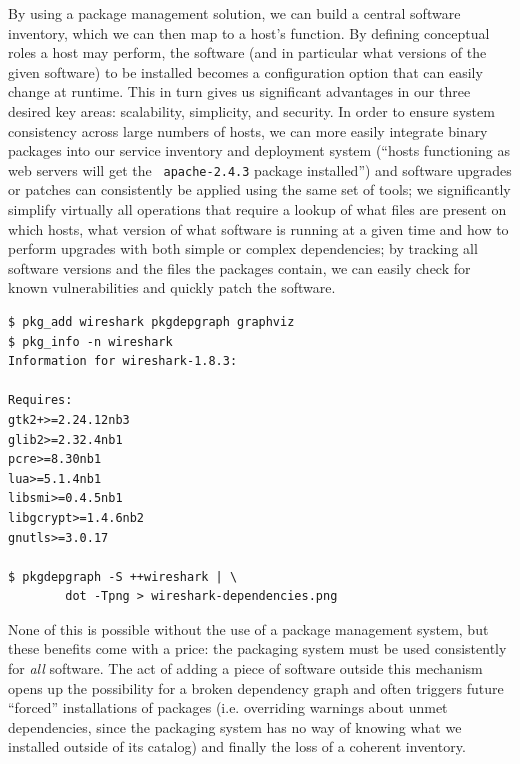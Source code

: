 By using a package management solution, we can build a
central software inventory, which we can then map to a
host's function.  By defining conceptual roles a host
may perform, the software (and in particular what
versions of the given software) to be installed
becomes a configuration option that can easily change
at runtime.  This in turn gives us significant
advantages in our three desired key areas:
scalability, simplicity, and security.  In order to
ensure system consistency across large numbers of
hosts, we can more easily integrate binary packages
into our service inventory and deployment system
(``hosts functioning as web servers will get the {\tt
apache-2.4.3} package installed'') and software
upgrades or patches can consistently be applied using
the same set of tools; we significantly simplify
virtually all operations that require a lookup of what
files are present on which hosts, what version of what
software is running at a given time and how to perform
upgrades with both simple or complex dependencies; by
tracking all software versions and the files the
packages contain, we can easily check for known
vulnerabilities and quickly patch the software.

\begin{lstlisting}[float,label=code:pkg_add,caption={[{\em
pkgrsc} sample commands]Example invocations of the
{\em pkgsrc} package manager and related tools to
visualize package dependencies.  Figure
\ref{fig:os-installation:wireshark} was created using
these commands.}]
$ pkg_add wireshark pkgdepgraph graphviz
$ pkg_info -n wireshark
Information for wireshark-1.8.3:

Requires:
gtk2+>=2.24.12nb3
glib2>=2.32.4nb1
pcre>=8.30nb1
lua>=5.1.4nb1
libsmi>=0.4.5nb1
libgcrypt>=1.4.6nb2
gnutls>=3.0.17

$ pkgdepgraph -S ++wireshark | \
        dot -Tpng > wireshark-dependencies.png
\end{lstlisting}

None of this is possible without the use of a package
management system, but these benefits come with a
price: the packaging system must be used consistently
for {\em all} software.  The act of adding a piece of
software outside this mechanism opens up the
possibility for a broken dependency graph and often
triggers future ``forced'' installations of packages
(i.e. overriding warnings about unmet dependencies,
since the packaging system has no way of knowing what
we installed outside of its catalog) and finally the
loss of a coherent inventory.

